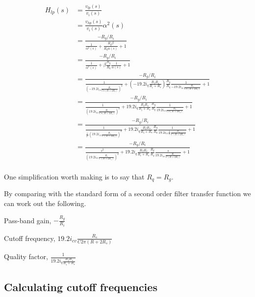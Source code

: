 \documentclass{article}
\begin{document}
\begin{equation*}
\begin{split}
  H_{lp}(s) & = \frac{v_{lp}(s)}{v_i(s)} \\
            & = \frac{v_{hp}(s)}{v_i(s)}\alpha^2(s) \\
            & = \frac{-R_g/R_i}{\frac{1}{\alpha^2(s)} + \frac{R_g\beta}{R_q\alpha(s)} + 1 } \\
            & = \frac{-R_g/R_i}{\frac{1}{\alpha^2(s)} + \beta\frac{R_g}{R_q}\frac{1}{\alpha(s)} + 1 } \\
            & = \frac{-R_g/R_i}{\frac{1}{(-19.2i_{cv}\frac{R_s}{Cs(R + 2R_s)})^2} + (-19.2i_{q}\frac{R_fR_s}{R_i + R_s})\frac{R_g}{R_q}\frac{1}{-19.2i_{cv}\frac{R_s}{Cs(R + 2R_s)}} + 1 } \\
            & = \frac{-R_g/R_i}{\frac{1}{(19.2i_{cv}\frac{R_s}{Cs(R + 2R_s)})^2} + 19.2i_{q}\frac{R_fR_s}{R_i + R_s}\frac{R_g}{R_q}\frac{1}{19.2i_{cv}\frac{R_s}{Cs(R + 2R_s)}} + 1 } \\
            & = \frac{-R_g/R_i}{\frac{1}{\frac{1}{s^2}(19.2i_{cv}\frac{R_s}{C(R + 2R_s)})^2} + 19.2i_{q}\frac{R_fR_s}{R_i + R_s}\frac{R_g}{R_q}\frac{1}{19.2i_{cv}\frac{1}{s}\frac{R_s}{C(R + 2R_s)}} + 1 } \\
            & = \frac{-R_g/R_i}{\frac{s^2}{(19.2i_{cv}\frac{R_s}{C(R + 2R_s)})^2} + 19.2i_{q}\frac{R_fR_s}{R_i + R_s}\frac{R_g}{R_q}\frac{s}{19.2i_{cv}\frac{R_s}{C(R + 2R_s)}} + 1 } \\
\end{split}
\end{equation*}

One simplification worth making is to say that $R_q = R_g$.

By comparing with the standard form of a second order filter transfer function we can work out the following.

\begin{description}
  \item Pass-band gain, $-\frac{R_g}{R_i}$
  \item Cutoff frequency, $19.2i_{cv}\frac{R_s}{C2\pi(R + 2R_s)}$
  \item Quality factor, $\frac{1}{19.2i_{q}\frac{R_fR_s}{R_i + R_s}}$
\end{description}

\subsection{Calculating cutoff frequencies}
\end{document}
